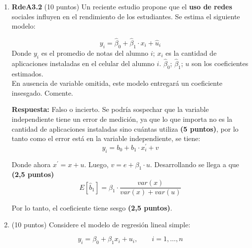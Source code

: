 \documentclass[10pt,a4paper]{article}
\begin{document}
\begin{enumerate}
{\color{blue}
Queremos contrastar si el tiempo promedio de entrega poblacional es $\mu_0=15$ d\'ias.
A partir de una muestra aleatoria de tama\~no $n=400$, se obtiene media muestral $\bar{x}=14.6$ y desviaci\'on est\'andar muestral $s=2$.


Como $n$ es grande, usamos aproximaci\'on normal con error est\'andar
\[
SE=\frac{s}{\sqrt{n}}=\frac{2}{\sqrt{400}}=\frac{2}{20}=0.1.
\]
(5 puntos)

\textbf{ Intervalo de confianza (95\%) para $\mu$}
\[
\bar{x}\pm z_{0.975}\,SE
=14.26\pm 1.96(0.1)
=14.26\pm 0.196
=(14.064,\ 14.456).
\]
El valor $15$ no pertenece a este intervalo. 
Con un 95\% de confianza, la evidencia emp\'irica \textbf{refuta} la afirmaci\'on del gerente: el tiempo promedio de entrega es
\emph{significativamente menor} que 15 d\'ias. (5 puntos)
}

    \item \textbf{RdeA3.2} (10 puntos) 
    Un reciente estudio propone que el {\bf uso de redes} sociales influyen en el rendimiento de los estudiantes. Se estima el siguiente  modelo:
    
    $$y_i = \hat{\beta}_0 + \hat{\beta}_1 \cdot x_i + \hat{u}_i$$
    Donde $y_i$ es el promedio de notas del alumno $i$; $x_i$ es la cantidad de aplicaciones instaladas en el celular del alumno $i$. $\hat{\beta}_0$; $\hat{\beta}_1$; $u$ son los coeficientes estimados.\\
    
    En ausencia de variable omitida, este modelo entregará un coeficiente insesgado. Comente.\\

    {\color{blue}\textbf{Respuesta:} Falso o incierto. Se podría sospechar que la variable independiente tiene un error de medición, ya que lo que importa no es la cantidad de aplicaciones instaladas sino cuántas utiliza \textbf{(5 puntos)}, por lo tanto como el error está en la variable independiente, se tiene:
    $$y_i = b_0 + b_1 \cdot x^{'}_i + v$$

    Donde ahora $x^{'} = x + u$. Luego, $v = e + \beta_1 \cdot u$. Desarrollando se llega a que \textbf{(2,5 puntos)}
    $$E[\hat{b}_1] = \beta_1 \cdot \frac{var(x)}{var(x) + var(u)}$$
    
    Por lo tanto, el coeficiente tiene sesgo \textbf{(2,5 puntos)}.
}

    \item (10 puntos)
Considere el modelo de regresión lineal simple:

\[
y_i = \beta_0 + \beta_1 x_i + u_i, \qquad i=1,\dots,n
\]


\end{enumerate}
\end{document}
